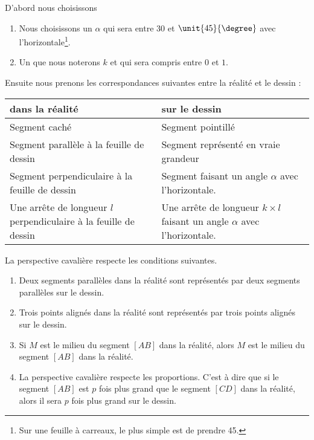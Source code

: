 \begin{Aretenir}
    D'abord nous choisissons
    \begin{enumerate}
        \item
            Nous choisissons un  \( \alpha\) qui sera entre \unit{30}{\degree} et \( \unit{45}{\degree}\) avec l'horizontale\footnote{Sur une feuille à carreaux, le plus simple est de prendre \unit{45}{\degree}.}.
        \item
            Un  que nous noterons \( k\) et qui sera compris entre \( 0\) et \( 1\).
    \end{enumerate}

    Ensuite nous prenons les correspondances suivantes entre la réalité et le dessin :
    \begin{center}
        \begin{tabular}{|p{7.5cm}|p{7.5cm}|}
            \hline
            {\bf dans la réalité}&{\bf sur le dessin}\\
            \hline\hline
            Segment caché  & Segment pointillé\\
            \hline
            Segment parallèle à la feuille de dessin & Segment représenté en vraie grandeur\\
            \hline
            Segment perpendiculaire à la feuille de dessin & Segment faisant un angle \( \alpha\) avec l'horizontale.\\
            \hline
            Une arrête de longueur \( l\) perpendiculaire à la feuille de dessin & Une arrête de longueur \( k\times l\) faisant un angle \( \alpha\) avec l'horizontale.\\
            \hline
        \end{tabular}
    \end{center}
\end{Aretenir}

\begin{propriete}
    La perspective cavalière respecte les conditions suivantes.
    \begin{enumerate}
        \item
             Deux segments parallèles dans la réalité sont représentés par deux segments parallèles sur le dessin.
         \item
             Trois points alignés dans la réalité sont représentés par trois points alignés sur le dessin.
         \item
             Si \( M\) est le milieu du segment \( [AB]\) dans la réalité, alors \( M\) est le milieu du segment \( [AB]\) dans la réalité.
         \item
             La perspective cavalière respecte les proportions. C'est à dire que si le segment \( [AB]\) est \( p\) fois plus grand que le segment \( [CD]\) dans la réalité, alors il sera \( p\) fois plus grand sur le dessin.
    \end{enumerate}
\end{propriete}

